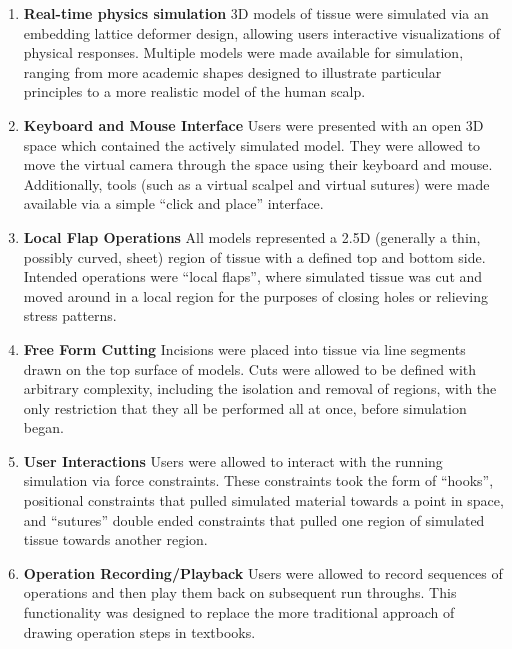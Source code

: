 \begin{enumerate}
\item \textbf{Real-time physics simulation} 3D models of tissue were
  simulated via an embedding lattice deformer design, allowing users
  interactive visualizations of physical responses. Multiple models
  were made available for simulation, ranging from more academic
  shapes designed to illustrate particular principles to a more
  realistic model of the human scalp. 

 \item \textbf{Keyboard and Mouse Interface} Users were presented with an
   open 3D space which contained the actively simulated model. They
   were allowed to move the virtual camera through the space using
   their keyboard and mouse. Additionally, tools (such as a virtual
   scalpel and virtual sutures) were made available via a simple
   ``click and place'' interface.
  
\item \textbf{Local Flap Operations} All models represented a 2.5D
  (generally a thin, possibly curved, sheet) region of tissue with a
  defined top and bottom side. Intended operations were ``local
  flaps'', where simulated tissue was cut and moved
  around in a local region for the purposes of closing holes or
  relieving stress patterns.

  \item \textbf{Free Form Cutting} Incisions were placed into
  tissue via line segments drawn on the top surface of models. Cuts
  were allowed to be defined with arbitrary complexity, including the
  isolation and removal of regions, with the only restriction that
  they all be performed all at once, before simulation began.

  \item \textbf{User Interactions} Users were allowed to interact with
    the running simulation via force constraints. These constraints
    took the form of ``hooks'', positional constraints that pulled
    simulated material towards a point in space, and ``sutures''
    double ended constraints that pulled one region of simulated
    tissue towards another region.

  \item \textbf{Operation Recording/Playback} Users were allowed to
    record sequences of operations and then play them back on
    subsequent run throughs. This functionality was designed to
    replace the more traditional approach of drawing operation steps
    in textbooks.
    
  \end{enumerate}


